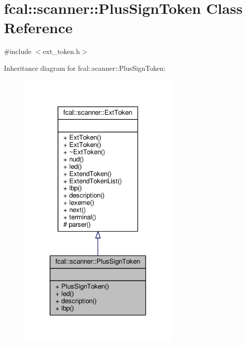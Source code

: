 \hypertarget{classfcal_1_1scanner_1_1PlusSignToken}{}\section{fcal\+:\+:scanner\+:\+:Plus\+Sign\+Token Class Reference}
\label{classfcal_1_1scanner_1_1PlusSignToken}


{\ttfamily \#include $<$ext\+\_\+token.\+h$>$}



Inheritance diagram for fcal\+:\+:scanner\+:\+:Plus\+Sign\+Token\+:
\nopagebreak
\begin{figure}[H]
\begin{center}
\leavevmode
\includegraphics[width=225pt]{classfcal_1_1scanner_1_1PlusSignToken__inherit__graph}
\end{center}
\end{figure}



